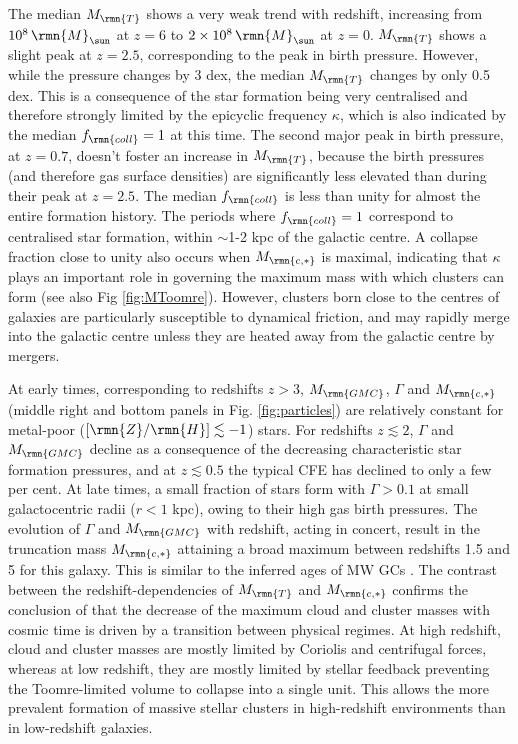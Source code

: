 \documentclass[fleqn,usenatbib]{mnras}
\newcommand\Msun{\,\rmn{M}_{\sun}}
\newcommand\ZH{\lbrack \rmn{Z}/\rmn{H} \rbrack}
\newcommand{\Mcstar}{M_\rmn{c,\ast}}
\newcommand{\Mtoomre}{M_\rmn{T}}
\newcommand{\Mgmc}{M_\rmn{GMC}}
\begin{document}
The median $\Mtoomre$ shows a very weak trend with redshift, increasing from $10^8 \Msun$ at $z=6$ to $2 \times 10^8 \Msun$ at $z=0$. $\Mtoomre$ shows a slight peak at $z=2.5$, corresponding to the peak in birth pressure. However, while the pressure changes by 3 dex, the median $\Mtoomre$ changes by only 0.5 dex. This is a consequence of the star formation being very centralised and therefore strongly limited by the epicyclic frequency $\kappa$, which is also indicated by the median $f_\rmn{coll}=1$ at this time. 
The second major peak in birth pressure, at $z=0.7$, doesn't foster an increase in $\Mtoomre$, because the birth pressures (and therefore gas surface densities) are significantly less elevated than during their peak at $z=2.5$. 
The median $f_\rmn{coll}$ is less than unity for almost the entire formation history. The periods where $f_\rmn{coll}=1$ correspond to centralised star formation, within $\sim$1-2 kpc of the galactic centre. A collapse fraction close to unity also occurs when $\Mcstar$ is maximal, indicating that $\kappa$ plays an important role in governing the maximum mass with which clusters can form (see also Fig \ref{fig:MToomre}). However, clusters born close to the centres of galaxies are particularly susceptible to dynamical friction, and may rapidly merge into the galactic centre unless they are heated away from the galactic centre by mergers.

At early times, corresponding to redshifts $z>3$, $\Mgmc$, $\Gamma$ and $\Mcstar$ (middle right and bottom panels in Fig. \ref{fig:particles}) are relatively constant for metal-poor ($\ZH \lesssim -1$) stars. For redshifts $z \lesssim 2$, $\Gamma$ and $\Mgmc$ decline as a consequence of the decreasing characteristic star formation pressures, and at $z \lesssim 0.5$ the typical CFE has declined to only a few per cent. At late times, a small fraction of stars form with $\Gamma > 0.1$ at small galactocentric radii ($r<1$ kpc), owing to their high gas birth pressures. 
The evolution of $\Gamma$ and $\Mgmc$ with redshift, acting in concert, result in the truncation mass $\Mcstar$ attaining a broad maximum between redshifts 1.5 and 5 for this galaxy. This is similar to the inferred ages of MW GCs \citep[e.g.][]{Dotter_Sarajedini_and_Anderson_11}. The contrast between the redshift-dependencies of $\Mtoomre$ and $\Mcstar$ confirms the conclusion of \citet{Reina-Campos_and_Kruijssen_17} that the decrease of the maximum cloud and cluster masses with cosmic time is driven by a transition between physical regimes. At high redshift, cloud and cluster masses are mostly limited by Coriolis and centrifugal forces, whereas at low redshift, they are mostly limited by stellar feedback preventing the Toomre-limited volume to collapse into a single unit. This allows the more prevalent formation of massive stellar clusters in high-redshift environments than in low-redshift galaxies.
\end{document}
